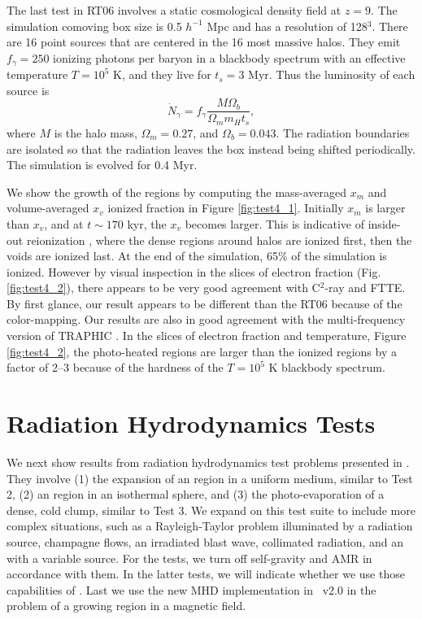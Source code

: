 \documentclass[useAMS,usenatbib,a4paper]{mn2e}
\begin{document}
The last test in RT06 involves a static cosmological density field at
$z=9$.  The simulation comoving box size is 0.5 $h^{-1}$ Mpc and has a
resolution of 128$^3$.  There are 16 point sources that are centered
in the 16 most massive halos.  They emit $f_\gamma = 250$ ionizing
photons per baryon in a blackbody spectrum with an effective
temperature $T = 10^5$ K, and they live for $t_s = 3$ Myr.  Thus the
luminosity of each source is
%
\begin{equation}
  \label{eqn:cosmo_lum}
  \dot{N}_\gamma = f_\gamma \frac{M \Omega_b} {\Omega_m m_H t_s},
\end{equation}
where $M$ is the halo mass, $\Omega_m = 0.27$, and $\Omega_b =
0.043$.  The radiation boundaries are isolated so that the radiation
leaves the box instead being shifted periodically.  The simulation is
evolved for 0.4 Myr.

We show the growth of the \hii regions by computing the
mass-averaged $x_m$ and volume-averaged $x_v$ ionized fraction in
Figure \ref{fig:test4_1}.  Initially $x_m$ is larger than $x_v$, and
at $t \sim 170$ kyr, the $x_v$ becomes larger.  This is indicative of
inside-out reionization \citep[e.g.][]{Gnedin00, Miralda00,
  Sokasian03}, where the dense regions around halos are ionized first,
then the voids are ionized last.  At the end of the simulation, 65\%
of the simulation is ionized.  However by visual inspection in the
slices of electron fraction (Fig. \ref{fig:test4_2}), there appears to
be very good agreement with C$^2$-ray and FTTE.  By first glance, our
result appears to be different than the RT06 because of the
color-mapping.  Our results are also in good agreement with the
multi-frequency version of TRAPHIC \citep[][see also for better
representations of the electron fraction slices]{Pawlik10}.  In the
slices of electron fraction and temperature, Figure \ref{fig:test4_2},
the photo-heated regions are larger than the ionized regions by a
factor of 2--3 because of the hardness of the $T = 10^5$ K blackbody
spectrum.

\section{Radiation Hydrodynamics Tests}
\label{sec:radhydro}

We next show results from radiation hydrodynamics test problems
presented in \citet[][hereafter RT09]{Iliev09}.  They involve (1) the
expansion of an \hii region in a uniform medium, similar to Test
2, (2) an \hii region in an isothermal sphere, and (3) the
photo-evaporation of a dense, cold clump, similar to Test 3.  We
expand on this test suite to include more complex situations, such as
a Rayleigh-Taylor problem illuminated by a radiation source, champagne
flows, an irradiated blast wave, collimated radiation, and an
\hii with a variable source.  For the \citeauthor{Iliev09}
tests, we turn off self-gravity and AMR in accordance with them.  In
the latter tests, we will indicate whether we use those capabilities
of \enzo.  Last we use the new MHD implementation in \enzo~v2.0 in the
problem of a growing \hii region in a magnetic field.
\end{document}
